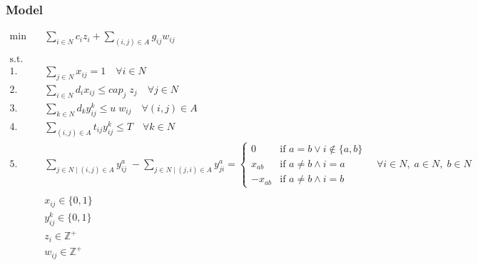 \subsubsection*{Model}

\begin{align*}
    \min \quad & \sum_{i \in N} c_i z_i + \sum_{(i, j) \in A} g_{ij} w_{ij} & \\
	\\
    \text{s.t.} \quad &  \\
	1. \quad & \sum_{j \in N} x_{ij} = 1 \quad \forall i \in N  \\
	2. \quad & \sum_{i \in N} d_i x_{ij} \le cap_j \; z_j \quad \forall j \in N  \\
	3. \quad & \sum_{k \in N} d_k y_{ij}^k \le u \; w_{ij} \quad \forall (i, j) \in A \quad  \\
	4. \quad & \sum_{(i, j) \in A} t_{ij} y_{ij}^k \le T \quad \forall k \in N  \\
	5. \quad & \sum_{j \in N \mid (i, j) \in A} y_{ij}^a \; - \sum_{j \in N \mid (j, i) \in A} y_{ji}^a = \left\{
	\begin{array}{rl}
		0  & \text{if } a = b \vee i \notin\{a, b\}  \\
		x_{ab}  & \text{if } a \ne b \land i = a  \\
		-x_{ab} & \text{if } a \ne b \land i = b
	\end{array}
	\right.
	\quad \forall i \in N, \; a \in N, \; b \in N  \\
	\\
	& x_{ij} \in \{0, 1\}  \\
	& y_{ij}^k \in \{0, 1\}  \\
	& z_i \in \mathbb{Z}^+  \\
	& w_{ij} \in \mathbb{Z}^+
\end{align*}
